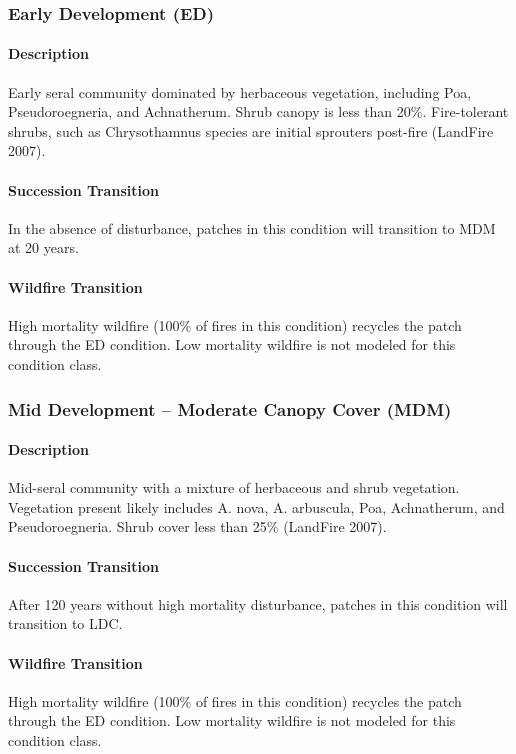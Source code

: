 \subsubsection{Early Development (ED)} 

\paragraph{Description} Early seral community dominated by herbaceous vegetation, including Poa, Pseudoroegneria, and Achnatherum. Shrub canopy is less than 20\%. Fire-tolerant shrubs, such as Chrysothamnus species are initial sprouters post-fire (LandFire 2007).

\paragraph{Succession Transition} In the absence of disturbance, patches in this condition will transition to MDM at 20 years. 

\paragraph{Wildfire Transition} High mortality wildfire (100\% of fires in this condition) recycles the patch through the ED condition. Low mortality wildfire is not modeled for this condition class.

\noindent\hrulefill


\subsubsection{Mid Development – Moderate Canopy Cover (MDM)}

\paragraph{Description} Mid-seral community with a mixture of herbaceous and shrub vegetation. Vegetation present likely includes A. nova, A. arbuscula, Poa, Achnatherum, and Pseudoroegneria.  Shrub cover less than 25\% (LandFire 2007).

\paragraph{Succession Transition} After 120 years without high mortality disturbance, patches in this condition will transition to LDC. 

\paragraph{Wildfire Transition} High mortality wildfire (100\% of fires in this condition) recycles the patch through the ED condition. Low mortality wildfire is not modeled for this condition class.

